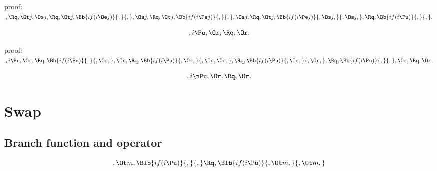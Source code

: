 \bigskip
\bigskip
\bigskip
\bigskip
proof:\\
\begin{math} 
,
\Rq, \Ot j, \Os j,\\\\\\
\Rq, \Ot j, \Bb{if(i \Oe j)}{,}{,}, \Os j,\\\\\\
\Rq, \Ot j, \Bb{if(i \Pe j)}{,}{,}, \Os j,\\\\\\
\Rq, \Ot j, \Bb{if(i \Pe j)}{, \Os j,}{, \Os j,},\\\\\\
\Rq, \Bb{if(i \Pu)}{,}{,},
\end{math}


\[, i \Pu, \Or, \Rq , \Or,\]

\bigskip
\bigskip
\bigskip
\bigskip
proof:\\
\begin{math} 
, i \Pu, \Or, \\\\
\Rq, \Bb{if( i \Pu)}{,}{, \Or,}, \Or,\\\\\\
\Rq, \Bb{if( i \Pu)}{, \Or,}{, \Or, \Or,},\\\\\\
\Rq, \Bb{if( i \Pu)}{, \Or,}{, \Or,},  \\\\\\
\Rq, \Bb{if( i \Pu)}{,}{,}, \Or,  \\\\\\
\Rq, \Or,
\end{math}



\[, i \nPu, \Or, \Rq , \Or,\]



\bigskip
\bigskip
\bigskip
\bigskip
\section{Swap}
\subsection{Branch function and operator}
\[,\Ot m, \Blb{if(i \Pu)}{,}{,} \Rq , \Blb{if(i \Pu)}{,\Ot m,}{,\Ot m,}\]

